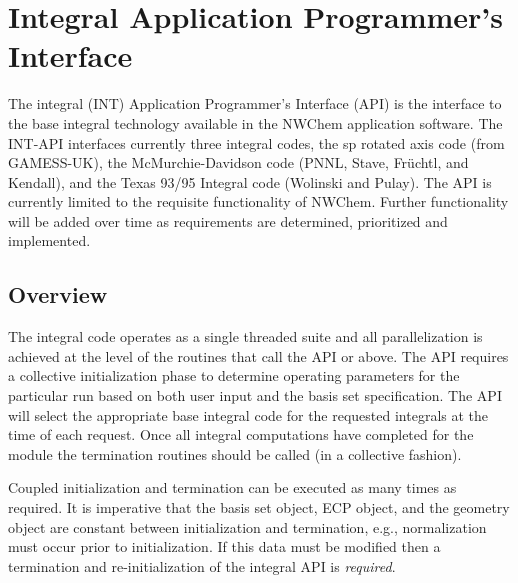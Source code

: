 %
%
\chapter{Integral Application Programmer's Interface} 
The integral (INT) Application Programmer's Interface (API) is the 
interface to the base integral technology available in the NWChem 
application software.  The INT-API interfaces currently three integral 
codes, the sp rotated axis code (from GAMESS-UK), the 
McMurchie-Davidson code (PNNL, Stave, Fr\"uchtl, and Kendall), and the 
Texas 93/95 Integral code (Wolinski and Pulay).  The API is currently 
limited to the requisite functionality of NWChem.  Further 
functionality will be added over time as requirements are determined, 
prioritized and implemented.   
 
\section{Overview} 
The integral code operates as a single threaded suite and all 
parallelization is achieved at the level of the routines that call the 
API or above.  The API requires a collective initialization phase to 
determine operating parameters for the particular run based on both 
user input and the basis set specification.  The API will select the 
appropriate base integral code for the requested integrals at the time 
of each request.  Once all integral computations have completed for 
the module the termination routines should be called (in a collective 
fashion). 
 
Coupled initialization and termination can be executed as many times 
as required. It is imperative that the basis set object, ECP object, 
and the geometry object are constant between initialization and 
termination, e.g., normalization must occur prior to initialization. 
If this data must be modified then a termination and re-initialization 
of the integral API is {\it required}. 
 
